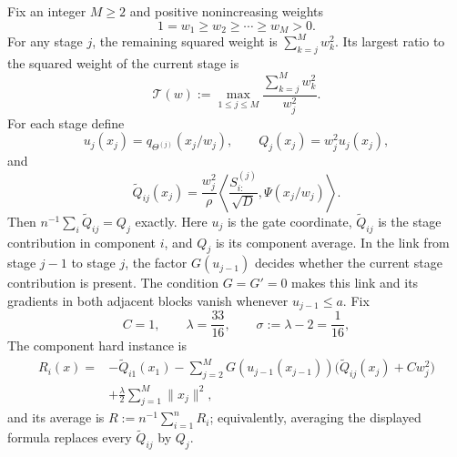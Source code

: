 \documentclass{article}
\theoremstyle{definition}
\begin{document}
Fix an integer $M\ge2$ and positive nonincreasing weights
\begin{equation}
 1=w_1\ge w_2\ge\cdots\ge w_M>0.
 \label{eq:weights}
\end{equation}
For any stage $j$, the remaining squared weight is
$\sum_{k=j}^M w_k^2$.  Its largest ratio to the squared weight of the current
stage is
\begin{equation}
 \mathcal T(w):=\max_{1\le j\le M}
 \frac{\sum_{k=j}^M w_k^2}{w_j^2}.
 \label{eq:weight-tail-ratio}
\end{equation}
For each stage define
\begin{equation}
 u_j(x_j)=q_{\Theta^{(j)}}(x_j/w_j),
 \qquad
 Q_j(x_j)=w_j^2u_j(x_j),
 \label{eq:weighted-radial-global}
\end{equation}
and
\begin{equation}
 \widetilde Q_{ij}(x_j)
 =\frac{w_j^2}{\rho}
 \left\langle\frac{S^{(j)}_{i:}}{\sqrt D},
 \Psi(x_j/w_j)\right\rangle.
 \label{eq:weighted-radial-component}
\end{equation}
Then $n^{-1}\sum_i\widetilde Q_{ij}=Q_j$ exactly.  Here $u_j$ is the gate
coordinate, $\widetilde Q_{ij}$ is the stage contribution in component $i$, and $Q_j$ is
its component average.  In the link from stage $j-1$ to stage $j$, the factor
$G(u_{j-1})$ decides whether the current stage contribution is present.  The
condition $G=G'=0$ makes this link and its gradients in both adjacent blocks vanish
whenever $u_{j-1}\le a$.  Fix
\begin{equation}
 C=1,
 \qquad
 \lambda=\frac{33}{16},
 \qquad
 \sigma:=\lambda-2=\frac1{16},
 \label{eq:pl-analytic-constants}
\end{equation}
The component hard instance is
\begin{equation}
\begin{aligned}
 R_i(x)
 ={}&-\widetilde Q_{i1}(x_1)
 -\sum_{j=2}^M
 G(u_{j-1}(x_{j-1}))
 \bigl(\widetilde Q_{ij}(x_j)+Cw_j^2\bigr)\\
 &+\frac\lambda2\sum_{j=1}^M\|x_j\|^2,
\end{aligned}
\label{eq:weighted-component}
\end{equation}
and its average is $R:=n^{-1}\sum_{i=1}^nR_i$; equivalently, averaging the
displayed formula replaces every $\widetilde Q_{ij}$ by $Q_j$.
\end{document}
